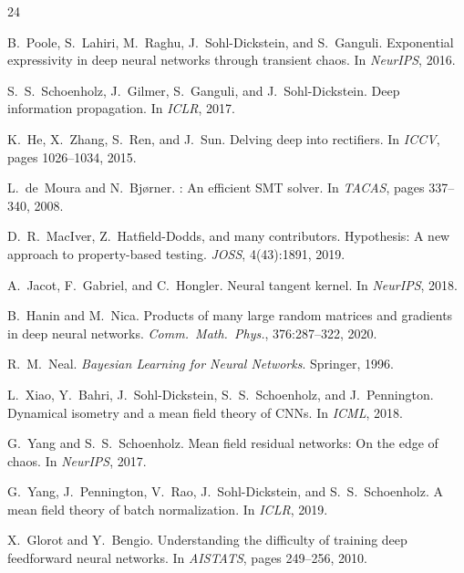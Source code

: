 \documentclass[10pt]{article}
\begin{document}
\begin{thebibliography}{24}

B.~Poole, S.~Lahiri, M.~Raghu, J.~Sohl-Dickstein, and S.~Ganguli.
\newblock Exponential expressivity in deep neural networks through transient chaos.
\newblock In \emph{NeurIPS}, 2016.

S.~S.~Schoenholz, J.~Gilmer, S.~Ganguli, and J.~Sohl-Dickstein.
\newblock Deep information propagation.
\newblock In \emph{ICLR}, 2017.

K.~He, X.~Zhang, S.~Ren, and J.~Sun.
\newblock Delving deep into rectifiers.
\newblock In \emph{ICCV}, pages 1026--1034, 2015.

L.~de~Moura and N.~Bj{\o}rner.
: An efficient {SMT} solver.
\newblock In \emph{TACAS}, pages 337--340, 2008.

D.~R.~MacIver, Z.~Hatfield-Dodds, and many contributors.
\newblock Hypothesis: A new approach to property-based testing.
\newblock \emph{JOSS}, 4(43):1891, 2019.

A.~Jacot, F.~Gabriel, and C.~Hongler.
\newblock Neural tangent kernel.
\newblock In \emph{NeurIPS}, 2018.

B.~Hanin and M.~Nica.
\newblock Products of many large random matrices and gradients in deep neural networks.
\newblock \emph{Comm.\ Math.\ Phys.}, 376:287--322, 2020.

R.~M.~Neal.
\newblock \emph{Bayesian Learning for Neural Networks}.
\newblock Springer, 1996.

L.~Xiao, Y.~Bahri, J.~Sohl-Dickstein, S.~S.~Schoenholz, and J.~Pennington.
\newblock Dynamical isometry and a mean field theory of {CNN}s.
\newblock In \emph{ICML}, 2018.

G.~Yang and S.~S.~Schoenholz.
\newblock Mean field residual networks: On the edge of chaos.
\newblock In \emph{NeurIPS}, 2017.

G.~Yang, J.~Pennington, V.~Rao, J.~Sohl-Dickstein, and S.~S.~Schoenholz.
\newblock A mean field theory of batch normalization.
\newblock In \emph{ICLR}, 2019.

X.~Glorot and Y.~Bengio.
\newblock Understanding the difficulty of training deep feedforward neural networks.
\newblock In \emph{AISTATS}, pages 249--256, 2010.


\end{thebibliography}
\end{document}
